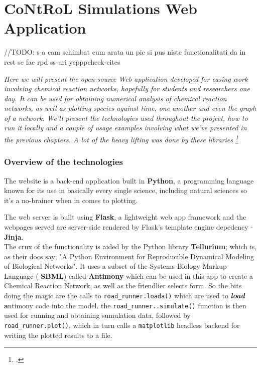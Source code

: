\chapter{CoNtRoL Simulations Web Application}
\label{ch:web-app}

//TODO: s-a cam schimbat cum arata un pic si pus niste functionalitati da in rest se fac rpd ss-uri yepppcheck-cites

\par
\textit{ Here we will present the open-source Web application developed for easing work involving chemical reaction networks, hopefully for students and researchers one day. It can be used for obtaining numerical analysis of chemical reaction networks, as well as plotting species against time, one another and even the graph of a network. We'll present the technologies used throughout the project, how to run it locally and a couple of usage examples involving what we've presented in the previous chapters. A lot of the heavy lifting was done by these libraries \footcite{10.1093/bioinformatics/btac730, xu2023SbmlDiagrams, medley2018tellurium, choi2018Tellurium}}

\subsection{Overview of the technologies}
The website is a back-end application built in \textbf{Python}, a programming language known for its use in basically every single science, including natural sciences so it's a no-brainer when in comes to plotting.

The web server is built using \textbf{Flask}, a lightweight web app framework and the webpages served are server-side rendered by Flask's template engine depedency - \textbf{Jinja}.
\\
The crux of the functionality is aided by the Python library \textbf{Tellurium}; which is, as their docs say; "A Python Environment for Reproducible Dynamical Modeling of Biological Networks". It uses a subset of the Systems Biology Markup Language ( \textbf{SBML}) called \textbf{Antimony} which can be used in this app to create a Chemical Reaction Network, as well as the friendlier selects form. So the bits doing the magic are the calls to \verb|road_runner.loada()| which are used to \textbf{\textit{load}}    \textbf{a}ntimony code into the model.
the \verb|road_runner..simulate()| function is then used for running and obtaining sumulation data, followed by \verb|road_runner.plot()|, which in turn calls a \verb|matplotlib| headless backend for writing the plotted results to a file.

